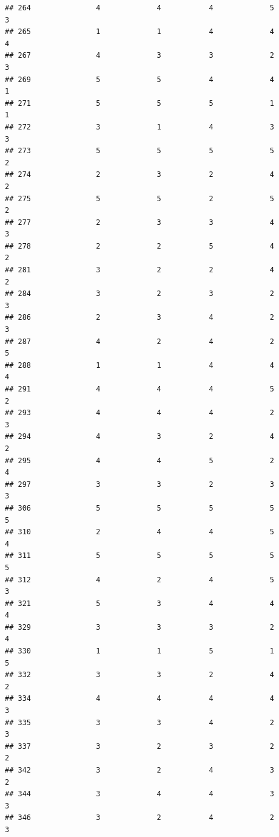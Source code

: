 \documentclass[
]{article}
\begin{document}
\begin{verbatim}
## 264               4             4           4             5            3
## 265               1             1           4             4            4
## 267               4             3           3             2            3
## 269               5             5           4             4            1
## 271               5             5           5             1            1
## 272               3             1           4             3            3
## 273               5             5           5             5            2
## 274               2             3           2             4            2
## 275               5             5           2             5            2
## 277               2             3           3             4            3
## 278               2             2           5             4            2
## 281               3             2           2             4            2
## 284               3             2           3             2            3
## 286               2             3           4             2            3
## 287               4             2           4             2            5
## 288               1             1           4             4            4
## 291               4             4           4             5            2
## 293               4             4           4             2            3
## 294               4             3           2             4            2
## 295               4             4           5             2            4
## 297               3             3           2             3            3
## 306               5             5           5             5            5
## 310               2             4           4             5            4
## 311               5             5           5             5            5
## 312               4             2           4             5            3
## 321               5             3           4             4            4
## 329               3             3           3             2            4
## 330               1             1           5             1            5
## 332               3             3           2             4            2
## 334               4             4           4             4            3
## 335               3             3           4             2            3
## 337               3             2           3             2            2
## 342               3             2           4             3            2
## 344               3             4           4             3            3
## 346               3             2           4             2            3

\end{verbatim}
\end{document}
